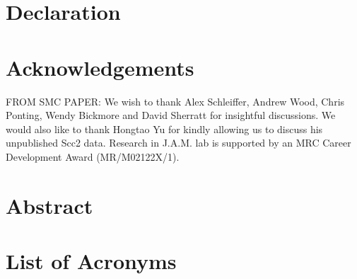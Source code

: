 \documentclass[a4paper,11pt,twoside,openright]{scrbook}
\begin{document}

\chapter*{Declaration}

\chapter*{}

\chapter*{Acknowledgements}
FROM SMC PAPER: We wish to thank Alex Schleiffer, Andrew Wood, Chris Ponting, Wendy Bickmore and David Sherratt for insightful discussions. We would also like to thank Hongtao Yu for kindly allowing us to discuss his unpublished Scc2 data. Research in J.A.M. lab is supported by an MRC Career Development Award (MR/M02122X/1).

\chapter*{Abstract}

\clearpage
\tableofcontents
{}

\clearpage
\listoffigures
{}

\clearpage
\listoftables
{}
\clearpage

%
%


\chapter*{List of Acronyms}

\begin{acronym}[proteins]
\end{acronym}
\end{document}
